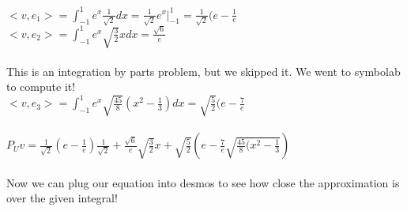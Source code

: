 \documentclass{article}
\begin{document}
$<v,e_1> = \int_{-1}^{1} e^x \frac{1}{\sqrt{2}} dx = \frac{1}{\sqrt{2}} e^x |_{-1}^{1} = \frac{1}{\sqrt{2}} (e-\frac{1}{e}$ \\
$<v,e_2> = \int_{-1}^{1} e^x \sqrt{\frac{3}{2}} x dx= \frac{\sqrt{6}}{e}$\\\\
This is an integration by parts problem, but we skipped it. We went to  symbolab to compute it! \\
$<v,e_3> = \int_{-1}^{1} e^x \sqrt{\frac{45}{8}} (x^2 - \frac{1}{3}) dx = \sqrt{\frac{5}{2}} (e - \frac{7}{e}$\\\\
$P_Uv = \frac{1}{\sqrt{2}} (e - \frac{1}{e}) \frac{1}{\sqrt{2}} + \frac{\sqrt{6}}{e} \sqrt{\frac{3}{2}} x + \sqrt{\frac{5}{2}} (e - \frac{7}{e} \sqrt{\frac{45}{8} (x^2 - \frac{1}{3}}) $ \\\\
Now we can plug our equation into desmos to see how close the approximation is over the given integral! 
\end{document}
